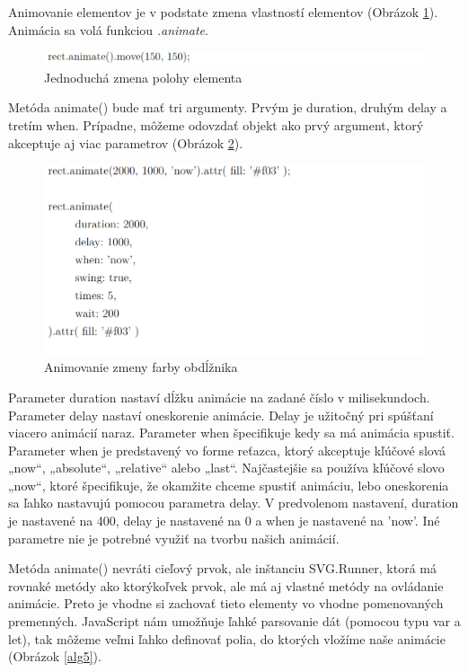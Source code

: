 \newpage
Animovanie elementov je v podstate zmena vlastností elementov (Obrázok \ref{alg3}). Animácia sa volá funkciou \emph{.animate}.

\begin{figure}[!htbp]
    \centering
    \includegraphics[width=15cm]{img/alg3.PNG}
    \caption{Jednoduchá zmena polohy elementa}
    \label{alg3}
\end{figure}

Metóda animate() bude mať tri argumenty. Prvým je duration, druhým  delay a tretím  when. Prípadne, môžeme odovzdať objekt ako prvý argument, ktorý akceptuje  aj viac parametrov  (Obrázok \ref{alg4}).

\begin{figure}[!htbp]
    \centering
    \includegraphics[width=15cm]{img/alg4.PNG}
    \caption{Animovanie zmeny farby obdĺžnika}
    \label{alg4}
\end{figure}

Parameter duration nastaví dĺžku animácie na zadané číslo v milisekundoch. Parameter delay nastaví oneskorenie animácie. Delay je užitočný pri spúšťaní viacero animácií naraz. Parameter when špecifikuje kedy sa má animácia spustiť. Parameter when je predstavený vo forme reťazca, ktorý akceptuje kľúčové slová „now“, „absolute“, „relative“ alebo „last“. Najčastejšie sa používa kľúčové slovo „now“, ktoré špecifikuje, že okamžite chceme spustiť animáciu, lebo oneskorenia sa ľahko nastavujú pomocou parametra delay. V  predvolenom    nastavení, duration je nastavené na 400, delay je nastavené na 0 a when je nastavené na ’now’. Iné parametre nie je potrebné využiť na tvorbu našich animácií.

\newpage

Metóda animate() nevráti cieľový prvok, ale inštanciu SVG.Runner, ktorá má rovnaké metódy ako ktorýkoľvek prvok, ale má aj vlastné metódy na ovládanie animácie. Preto je vhodne si zachovať tieto elementy vo vhodne pomenovaných premenných. JavaScript nám umožňuje ľahké parsovanie dát (pomocou typu var a let), tak môžeme veľmi ľahko definovať polia, do ktorých vložíme naše animácie (Obrázok \ref{alg5}).

